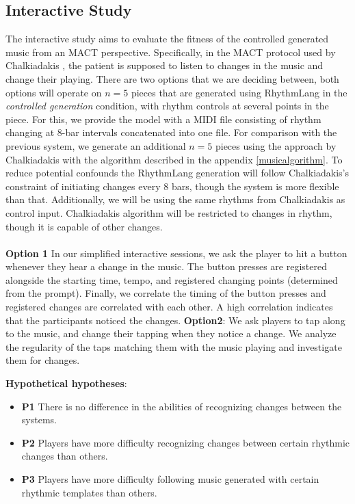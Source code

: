\subsection{Interactive Study}
The interactive study aims to evaluate the fitness of the controlled generated music from an MACT perspective. Specifically, in the MACT protocol used by Chalkiadakis \cite{Chalkiadakis_2022}, the patient is supposed to listen to changes in the music and change their playing. There are two options that we are deciding between, both options will operate on $n=5$ pieces that are generated using RhythmLang in the \textit{controlled generation} condition, with rhythm controls at several points in the piece. For this, we provide the model with a MIDI file consisting of rhythm changing at 8-bar intervals concatenated into one file.
For comparison with the previous system, we generate an additional $n=5$ pieces using the approach by Chalkiadakis \cite{Chalkiadakis_2022} with the algorithm described in the appendix \ref{musicalgorithm}. To reduce potential confounds the RhythmLang generation will follow Chalkiadakis's constraint of initiating changes every 8 bars, though the system is more flexible than that. Additionally, we will be using the same rhythms from Chalkiadakis as control input. Chalkiadakis algorithm will be restricted to changes in rhythm, though it is capable of other changes.\\\\
\textbf{Option 1}
In our simplified interactive sessions, we ask the player to hit a button whenever they hear a change in the music. The button presses are registered alongside the starting time, tempo, and registered changing points (determined from the prompt). Finally, we correlate the timing of the button presses and registered changes are correlated with each other. A high correlation indicates that the participants noticed the changes. 
\textbf{Option2}: We ask players to tap along to the music, and change their tapping when they notice a change. We analyze the regularity of the taps matching them with the music playing and investigate them for changes. 

\textbf{Hypothetical hypotheses}: 
\begin{itemize}
\item \textbf{P1} There is no difference in the abilities of recognizing changes between the systems.
\item \textbf{P2} Players have more difficulty recognizing changes between certain rhythmic changes than others.
\item \textbf{P3} Players have more difficulty following music generated with certain rhythmic templates than others.     
\end{itemize}

